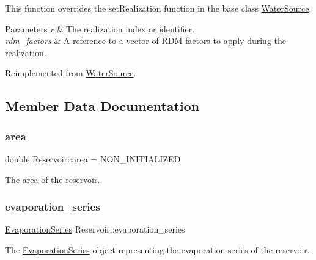 This function overrides the {\ttfamily set\+Realization} function in the base class {\ttfamily \mbox{\hyperlink{classWaterSource}{Water\+Source}}}.


\begin{DoxyParams}{Parameters}
{\em r} & The realization index or identifier. \\
\hline
{\em rdm\+\_\+factors} & A reference to a vector of R\+DM factors to apply during the realization. \\
\hline
\end{DoxyParams}


Reimplemented from \mbox{\hyperlink{classWaterSource_a634904c510b16de6d7c057fed6d6e625}{Water\+Source}}.



\subsection{Member Data Documentation}
\mbox{\label{classReservoir_a57ab55e0dde9e29a4ff97de98b09e458}} 
\subsubsection{\texorpdfstring{area}{area}}
{\footnotesize\ttfamily double Reservoir\+::area = N\+O\+N\+\_\+\+I\+N\+I\+T\+I\+A\+L\+I\+Z\+ED\hspace{0.3cm}{\ttfamily [protected]}}



The area of the reservoir. 

\mbox{\label{classReservoir_a2d2d9b302c13703309bb798d24136810}} 
\subsubsection{\texorpdfstring{evaporation\+\_\+series}{evaporation\_series}}
{\footnotesize\ttfamily \mbox{\hyperlink{classEvaporationSeries}{Evaporation\+Series}} Reservoir\+::evaporation\+\_\+series}



The \mbox{\hyperlink{classEvaporationSeries}{Evaporation\+Series}} object representing the evaporation series of the reservoir. 

